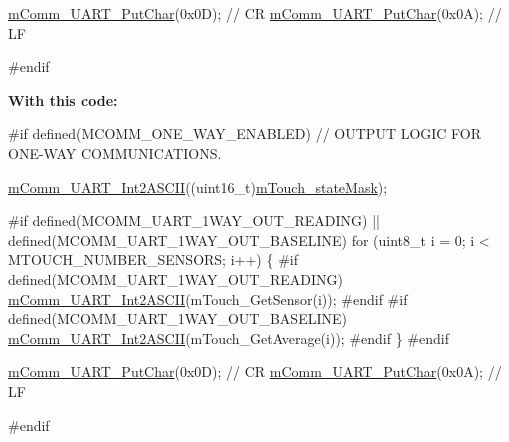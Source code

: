 \begin{DoxyEnumerate}
\begin{DoxyCode}
    \hyperlink{m_comm_8c_a52e190faf8c2c0afe082c6ab232da4c8}{mComm\_UART\_PutChar}(0x0D);   \textcolor{comment}{// CR                   }
    \hyperlink{m_comm_8c_a52e190faf8c2c0afe082c6ab232da4c8}{mComm\_UART\_PutChar}(0x0A);   \textcolor{comment}{// LF}

\textcolor{preprocessor}{#endif}
\end{DoxyCode}


{\bfseries With this code\+:} 
\begin{DoxyCode}
\textcolor{preprocessor}{#if defined(MCOMM\_ONE\_WAY\_ENABLED)}
    \textcolor{comment}{// OUTPUT LOGIC FOR ONE-WAY COMMUNICATIONS.}

    \hyperlink{m_comm_8c_af25da52c9da7c8fa9337c43ad5d7a1b6}{mComm\_UART\_Int2ASCII}((uint16\_t)\hyperlink{m_touch_8c_ab288c49098e419b3232336a4245b757d}{mTouch\_stateMask});
    
\textcolor{preprocessor}{    #if defined(MCOMM\_UART\_1WAY\_OUT\_READING) || defined(MCOMM\_UART\_1WAY\_OUT\_BASELINE)}
    \textcolor{keywordflow}{for} (uint8\_t i = 0; i < MTOUCH\_NUMBER\_SENSORS; i++)
    \{
\textcolor{preprocessor}{        #if defined(MCOMM\_UART\_1WAY\_OUT\_READING)}
        \hyperlink{m_comm_8c_af25da52c9da7c8fa9337c43ad5d7a1b6}{mComm\_UART\_Int2ASCII}(mTouch\_GetSensor(i));      
\textcolor{preprocessor}{        #endif                                          }
\textcolor{preprocessor}{        #if defined(MCOMM\_UART\_1WAY\_OUT\_BASELINE)}
        \hyperlink{m_comm_8c_af25da52c9da7c8fa9337c43ad5d7a1b6}{mComm\_UART\_Int2ASCII}(mTouch\_GetAverage(i));     
\textcolor{preprocessor}{        #endif}
    \}
\textcolor{preprocessor}{    #endif}
    
    \hyperlink{m_comm_8c_a52e190faf8c2c0afe082c6ab232da4c8}{mComm\_UART\_PutChar}(0x0D);   \textcolor{comment}{// CR                   }
    \hyperlink{m_comm_8c_a52e190faf8c2c0afe082c6ab232da4c8}{mComm\_UART\_PutChar}(0x0A);   \textcolor{comment}{// LF}

\textcolor{preprocessor}{#endif}
\end{DoxyCode}
 
\end{DoxyEnumerate}